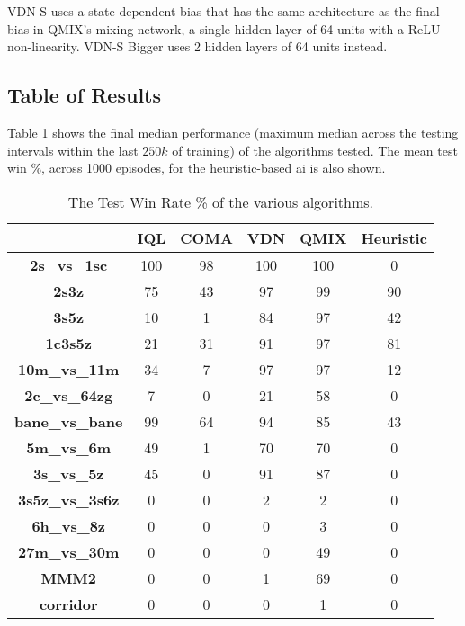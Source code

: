 \documentclass[twoside,11pt]{article}
\begin{document}
VDN-S uses a state-dependent bias that has the same architecture as the final bias in QMIX's mixing network, a single hidden layer of 64 units with a ReLU non-linearity.
VDN-S Bigger uses 2 hidden layers of 64 units instead.

\subsection{Table of Results}
\label{sec:table_results}

Table \ref{tab:hai} shows the final median performance (maximum median across the testing intervals within the last $250k$ of training) of the algorithms tested.
The mean test win \%, across 1000 episodes, for the heuristic-based ai is also shown.
\begin{table}[h]
    \setlength{\extrarowheight}{3pt}
    \centering
    \begin{center}
        \begin{tabular}{| c | c | c | c | c | c |}
        \hline
        ~&\textbf{IQL}&\textbf{COMA}&\textbf{VDN}&\textbf{QMIX}&\textbf{Heuristic}\\
        \hline \hline
\textbf{2s\_vs\_1sc} &
100&
 98&
100&
100&
0\\
\hline

\textbf{2s3z} &
 75&
 43&
 97&
 99&
90\\
\hline

\textbf{3s5z} &
 10&
  1&
 84&
 97&
42\\
\hline

\textbf{1c3s5z} &
 21&
 31&
 91&
 97&
81\\
\hline

\textbf{10m\_vs\_11m} &
 34&
  7&
 97&
 97&
12\\
\hline
\hline

\textbf{2c\_vs\_64zg} &
  7&
  0&
 21&
 58&
0\\
\hline

\textbf{bane\_vs\_bane} &
 99&
 64&
 94&
 85&
43\\
\hline

\textbf{5m\_vs\_6m} &
 49&
  1&
 70&
 70&
0\\
\hline

\textbf{3s\_vs\_5z} &
 45&
  0&
 91&
 87&
0\\
\hline
\hline

\textbf{3s5z\_vs\_3s6z} &
  0&
  0&
  2&
  2&
0\\
\hline

\textbf{6h\_vs\_8z} &
  0&
  0&
  0&
  3&
0\\
\hline

\textbf{27m\_vs\_30m} &
  0&
  0&
  0&
 49&
0\\
\hline

\textbf{MMM2} &
  0&
  0&
  1&
 69&
0\\
\hline

\textbf{corridor} &
  0&
  0&
  0&
  1&
0\\
\hline
        \end{tabular}
        \caption{The Test Win Rate \% of the various algorithms.}
    \end{center}
    \label{tab:hai}
\end{table}
\end{document}
